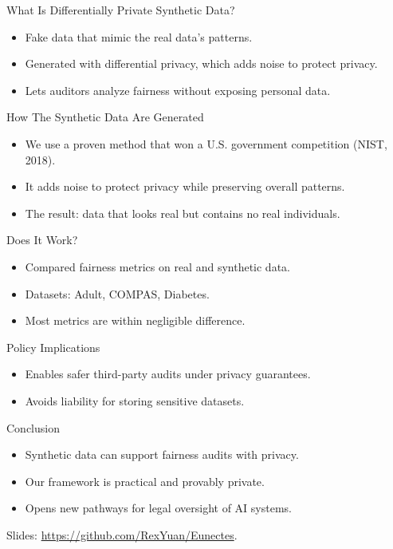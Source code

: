 \documentclass{beamer}
\begin{document}
\begin{frame}{What Is Differentially Private Synthetic Data?}
  \begin{itemize}
    \item Fake data that mimic the real data's patterns.
    \item Generated with differential privacy, which adds noise to protect privacy.
    \item Lets auditors analyze fairness without exposing personal data.
  \end{itemize}
\end{frame}

\begin{frame}{How The Synthetic Data Are Generated}
  \begin{itemize}
    \item We use a proven method that won a U.S. government competition (NIST, 2018).
    \item It adds noise to protect privacy while preserving overall patterns.
    \item The result: data that looks real but contains no real individuals.
  \end{itemize}
\end{frame}

\begin{frame}{Does It Work?}
  \begin{itemize}
    \item Compared fairness metrics on real and synthetic data.
    \item Datasets: Adult, COMPAS, Diabetes.
    \item Most metrics are within negligible difference.
  \end{itemize}
\end{frame}

\begin{frame}{Policy Implications}
  \begin{itemize}
    \item Enables safer third-party audits under privacy guarantees.
    \item Avoids liability for storing sensitive datasets.
  \end{itemize}
\end{frame}

\begin{frame}{Conclusion}
  \begin{itemize}
    \item Synthetic data can support fairness audits with privacy.
    \item Our framework is practical and provably private.
    \item Opens new pathways for legal oversight of AI systems.
  \end{itemize}

  Slides: \url{https://github.com/RexYuan/Eunectes}.
\end{frame}
\end{document}
